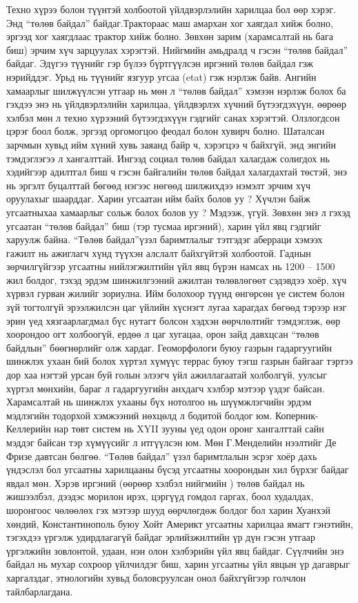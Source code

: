 Техно хүрээ болон түүнтэй холбоотой үйлдвэрлэлийн харилцаа бол өөр хэрэг. Энд “төлөв байдал” байдаг.Трактораас маш амархан хог хаягдал хийж болно, эргээд хог хаягдлаас трактор хийж болно. Зөвхөн зарим (харамсалтай нь бага биш) эрчим хүч зарцуулах хэрэгтэй. Нийгмийн амьдралд ч гэсэн “төлөв байдал” байдаг. Эдүгээ түүнийг гэр бүлээ бүртгүүлсэн иргэний төлөв байдал гэж нэрийддэг. Урьд нь түүнийг язгуур угсаа (etat) гэж нэрлэж байв. Ангийн хамаарлыг шилжүүлсэн утгаар нь мөн л “төлөв байдал” хэмээн нэрлэж болох ба гэхдээ энэ нь үйлдвэрлэлийн харилцаа, үйлдвэрлэх хүчний бүтээгдэхүүн, өөрөөр хэлбэл мөн л техно хүрээний бүтээгдэхүүн гэдгийг санах хэрэгтэй. Олзлогдсон цэрэг боол болж, эргээд оргомогцоо феодал болон хувирч болно. Шаталсан зарчмын хувьд ийм хүний хувь заяанд байр ч, хэрэгцээ ч байхгүй, энд энгийн тэмдэглэгээ л хангалттай. Ингээд социал төлөв байдал халагдаж солигдох нь хэдийгээр адилтгал биш ч гэсэн байгалийн төлөв байдал халагдахтай төстэй, энэ нь эргэлт буцалттай бөгөөд нэгээс нөгөөд шилжихдээ нэмэлт эрчим хүч оруулахыг шаарддаг. Харин угсаатан ийм байх болов уу ? Хүчлэн байж угсаатныхаа хамаарлыг сольж болох болов уу ? Мэдээж, үгүй. Зөвхөн энэ л гэхэд угсаатан “төлөв байдал” биш (тэр тусмаа иргэний), харин үйл явц гэдгийг харуулж байна.
“Төлөв байдал”үзэл баримтлалыг тэтгэдэг аберраци хэмээх гажилт нь ажиглагч хүнд түүхэн алслалт байхгүйтэй холбоотой. Гаднын зөрчилгүйгээр угсаатны нийлэгжилтийн үйл явц бүрэн намсах нь 1200 – 1500 жил болдог, тэхэд эрдэм шинжилгээний ажилтан төлөвлөгөөт сэдэвдээ хоёр, хүч хүрвэл гурван жилийг зориулна. Ийм болохоор түүнд өнгөрсөн үе систем болон зүй тогтолгүй эрээлжилсэн цаг үйлийн хүснэгт лугаа харагдах бөгөөд тэрээр нэг эрин үед хязгаарлагдмал бүс нутагт болсон хэдхэн өөрчлөлтийг тэмдэглэж, өөр хоорондоо огт холбоогүй, ердөө л цаг хугацаа, орон зайд давхцсан “төлөв байдлын” бөөгнөрлийг олж хардаг. Геоморфологи буюу газрын гадаргуугийн шинжлэх ухаан бий болох хүртэл хүмүүс террас буюу тэгш газрын байгааг тэртээ дор хаа нэгтэй урсан буй голын элээгч үйл ажиллагаатай холболгүй, уулсыг хүртэл мөнхийн, бараг л гадаргуугийн анхдагч хэлбэр мэтээр үздэг байсан. Харамсалтай нь шинжлэх ухааны бүх нотолгоо нь шүүмжлэгчийн эрдэм мэдлэгийн тодорхой хэмжээний нөхцөлд л бодитой болдог юм. Коперник-Келлерийн нар төвт систем нь XYII зууны үед одон оронг хангалттай сайн мэддэг байсан тэр хүмүүсийг л итгүүлсэн юм. Мөн Г.Менделийн нээлтийг Де Фризе давтсан бөлгөө.
“Төлөв байдал” үзэл баримтлалын эсрэг хоёр дахь үндэслэл бол угсаатны харилцааны бүсэд угсаатны хоорондын хил бүрхэг байдаг явдал мөн. Хэрэв иргэний (өөрөөр хэлбэл нийгмийн ) төлөв байдал нь жишээлбэл, дээдэс морилон ирэх, цэргүүд гомдол гаргах, боол худалдах, шоронгоос чөлөөлөх гэх мэтээр шууд өөрчлөгдөж болдог бол харин Хуанхэй хөндий, Константинополь буюу Хойт Америкт угсаатны харилцаа ямагт гэнэтийн, тэгэхдээ үргэлж удирдлагагүй байдаг эрлийзжилтийн үр дүн гэсэн утгаар үргэлжийн зовлонтой, удаан, нэн олон хэлбэрийн үйл явц байдаг. Сүүлчийн энэ байдал нь мухар сохроор үйлчилдэг биш, харин угсаатны үйл явцын үр дагаврыг харгалздаг, этнологийн хувьд боловсруулсан онол байхгүйгээр голчлон тайлбарлагдана.

